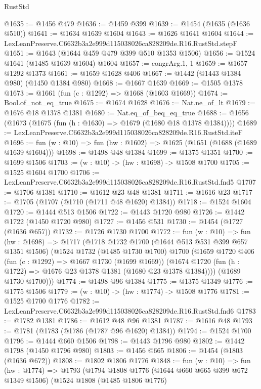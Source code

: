 \begin{lexlean}{RustStd}
\begin{coremodule}
@1635 := @1456 @479
@1636 := @1459 @399
@1639 := @1454 (@1635 (@1636 @510))
@1641 := @1634 @1639 @1604
@1643 := @1626 @1641 @1604
@1644 := LexLeanPreserve.C6632b3a2e999d115038026ca828209de.R16.RustStd.stepF
@1651 := @1643 (@1644 @459 @479 @399 @510 @1353 @1506)
@1656 := @1524 @1641 (@1485 @1639 @1604) @1604
@1657 := congrArg.{1, 1}
@1659 := @1657 @1292 @1373
@1661 := @1659 @1628 @406
@1667 := @1442 (@1443 @1384 @980) (@1450 @1384 @980)
@1668 := @1667 @1639
@1669 := @1505 @1378
@1673 := @1661 (fun (c : @1292) => @1668 (@1603 @1669))
@1674 := Bool.of_not_eq_true
@1675 := @1674 @1628
@1676 := Nat.ne_of_lt
@1679 := @1676 @18 @1378 @1381
@1680 := Nat.eq_of_beq_eq_true
@1688 := @1656 (@1673 (@1675 (fun (h : @1630) => @1679 (@1680 @18 @1378 @1384))))
@1689 := LexLeanPreserve.C6632b3a2e999d115038026ca828209de.R16.RustStd.iteF
@1696 := fun (w : @10) => fun (hw : @1602) => @1625 (@1651 (@1688 (@1689 @1639 @1604)))
@1698 := @1498 @48 @1384
@1699 := @1375 @1351
@1700 := @1699 @1506
@1703 := (w : @10) -> (hw : @1698) -> @1508 @1700
@1705 := @1525 @1604 @1700
@1706 := LexLeanPreserve.C6632b3a2e999d115038026ca828209de.R16.RustStd.fnd5
@1707 := @1706 @1381
@1710 := @1612 @23 @48 @1381
@1711 := @1616 @23
@1717 := @1705 (@1707 (@1710 (@1711 @48 @1620) @1384))
@1718 := @1524 @1604
@1720 := @1444 @513 @1506
@1722 := @1443 @1720 @980
@1726 := @1442 @1722 (@1450 @1720 @980)
@1727 := @1456 @531
@1730 := @1454 (@1727 (@1636 @657))
@1732 := @1726 @1730 @1700
@1772 := fun (w : @10) =>
  fun (hw : @1698) =>
  @1717
    (@1718
      @1732
      @1700
      (@1644 @513 @531 @399 @657 @1351 @1506)
      (@1524
        @1732
        (@1485 @1730 @1700)
        @1700
        (@1659
          @1720
          @406
          (fun (c : @1292) => @1667 @1730 (@1699 @1669))
          (@1674 @1720 (fun (h : @1722) => @1676 @23 @1378 @1381 (@1680 @23 @1378 @1384))))
        (@1689 @1730 @1700)))
@1774 := @1498 @96 @1384
@1775 := @1375 @1349
@1776 := @1775 @1506
@1779 := (w : @10) -> (hw : @1774) -> @1508 @1776
@1781 := @1525 @1700 @1776
@1782 := LexLeanPreserve.C6632b3a2e999d115038026ca828209de.R16.RustStd.fnd6
@1783 := @1782 @1381
@1786 := @1612 @48 @96 @1381
@1787 := @1616 @48
@1793 := @1781 (@1783 (@1786 (@1787 @96 @1620) @1384))
@1794 := @1524 @1700
@1796 := @1444 @660 @1506
@1798 := @1443 @1796 @980
@1802 := @1442 @1798 (@1450 @1796 @980)
@1803 := @1456 @665
@1806 := @1454 (@1803 (@1636 @672))
@1808 := @1802 @1806 @1776
@1848 := fun (w : @10) =>
  fun (hw : @1774) =>
  @1793
    (@1794
      @1808
      @1776
      (@1644 @660 @665 @399 @672 @1349 @1506)
      (@1524
        @1808
        (@1485 @1806 @1776)

\end{coremodule}
\end{lexlean}
